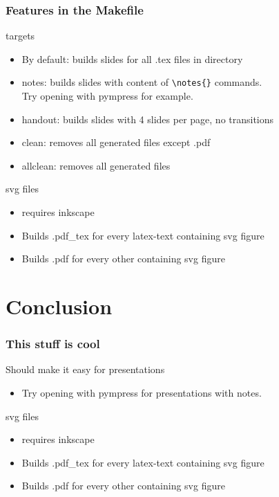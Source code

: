 \documentclass[c,12pt]{beamer}
\begin{document}
\begin{frame}[fragile]
	\frametitle{Features in the Makefile}
	\begin{block}{targets}
		\begin{itemize}
			\item By default: builds slides for all .tex files in directory
			\item notes: builds slides with content of \verb|\notes{}| commands.\\ Try opening with pympress for example.
			\item handout: builds slides with 4 slides per page, no transitions
			\item clean: removes all generated files except .pdf
			\item allclean: removes all generated files
		\end{itemize}
	\end{block}
	\pause
	\begin{block}{svg files}
		\begin{itemize}
			\item requires inkscape
			\item Builds .pdf\_tex for every latex-text containing svg figure
			\item Builds .pdf for every other containing svg figure
		\end{itemize}
	\end{block}
\end{frame}

\section{Conclusion}

\begin{frame}
	\frametitle{This stuff is cool}
	\begin{block}{Should make it easy for presentations}
		\begin{itemize}
			\item Try opening with pympress for presentations with notes.
		\end{itemize}
	\end{block}
	\pause
	\begin{block}{svg files}
		\begin{itemize}
			\item requires inkscape
			\item Builds .pdf\_tex for every latex-text containing svg figure
			\item Builds .pdf for every other containing svg figure
		\end{itemize}
	\end{block}
\end{frame}
\end{document}
